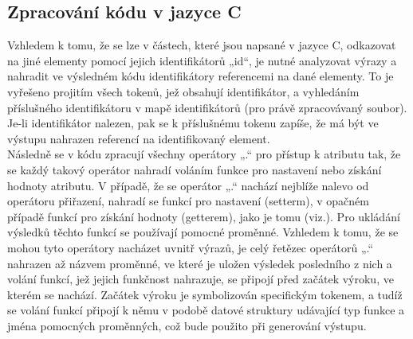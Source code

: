 \documentclass[report,11pt]{elsarticle}
\begin{document}
\subsection{\label{SEC:Intro}Zpracování kódu v jazyce C}
Vzhledem k tomu, že se lze v částech, které jsou napsané v jazyce C, odkazovat na jiné elementy pomocí jejich identifikátorů „id“, je nutné analyzovat výrazy a nahradit ve výsledném kódu identifikátory referencemi na dané elementy. To je vyřešeno projitím všech tokenů, jež obsahují identifikátor, a vyhledáním příslušného identifikátoru v mapě identifikátorů (pro právě zpracovávaný soubor). Je-li identifikátor nalezen, pak se k příslušnému tokenu zapíše, že má být ve výstupu nahrazen referencí na identifikovaný element.\\
Následně se v kódu zpracují všechny operátory „.“ pro přístup k atributu tak, že se každý takový operátor nahradí voláním funkce pro nastavení nebo získání hodnoty atributu. V případě, že se operátor „.“ nachází nejblíže nalevo od operátoru přiřazení, nahradí se funkcí pro nastavení (setterm), v opačném případě funkcí pro získání hodnoty (getterem), jako je tomu (viz.). Pro ukládání výsledků těchto funkcí se používají pomocné proměnné. Vzhledem k tomu, že se mohou tyto operátory nacházet uvnitř výrazů, je celý řetězec operátorů „.“ nahrazen až názvem proměnné, ve které je uložen výsledek posledního z nich a volání funkcí, jež jejich funkčnost nahrazuje, se připojí před začátek výroku, ve kterém se nachází. Začátek výroku je symbolizován specifickým tokenem, a tudíž se volání funkcí připojí k němu v podobě datové struktury udávající typ funkce a jména pomocných proměnných, což bude použito při generování výstupu.
\end{document}
